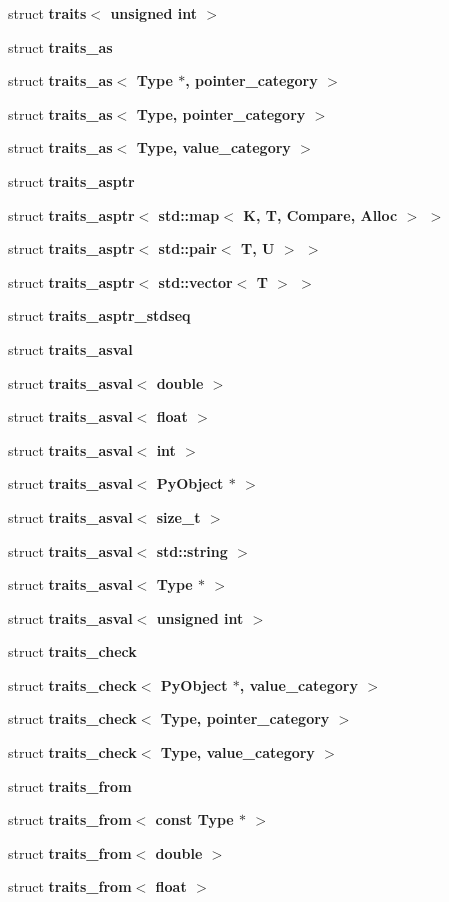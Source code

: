 \begin{DoxyCompactItemize}
struct {\bf traits$<$ unsigned int $>$}
\item 
struct {\bf traits\+\_\+as}
\item 
struct {\bf traits\+\_\+as$<$ Type $\ast$, pointer\+\_\+category $>$}
\item 
struct {\bf traits\+\_\+as$<$ Type, pointer\+\_\+category $>$}
\item 
struct {\bf traits\+\_\+as$<$ Type, value\+\_\+category $>$}
\item 
struct {\bf traits\+\_\+asptr}
\item 
struct {\bfseries traits\+\_\+asptr$<$ std\+::map$<$ K, T, Compare, Alloc $>$ $>$}
\item 
struct {\bfseries traits\+\_\+asptr$<$ std\+::pair$<$ T, U $>$ $>$}
\item 
struct {\bfseries traits\+\_\+asptr$<$ std\+::vector$<$ T $>$ $>$}
\item 
struct {\bf traits\+\_\+asptr\+\_\+stdseq}
\item 
struct {\bf traits\+\_\+asval}
\item 
struct {\bf traits\+\_\+asval$<$ double $>$}
\item 
struct {\bf traits\+\_\+asval$<$ float $>$}
\item 
struct {\bf traits\+\_\+asval$<$ int $>$}
\item 
struct {\bf traits\+\_\+asval$<$ Py\+Object $\ast$ $>$}
\item 
struct {\bf traits\+\_\+asval$<$ size\+\_\+t $>$}
\item 
struct {\bfseries traits\+\_\+asval$<$ std\+::string $>$}
\item 
struct {\bf traits\+\_\+asval$<$ Type $\ast$ $>$}
\item 
struct {\bf traits\+\_\+asval$<$ unsigned int $>$}
\item 
struct {\bf traits\+\_\+check}
\item 
struct {\bf traits\+\_\+check$<$ Py\+Object $\ast$, value\+\_\+category $>$}
\item 
struct {\bf traits\+\_\+check$<$ Type, pointer\+\_\+category $>$}
\item 
struct {\bf traits\+\_\+check$<$ Type, value\+\_\+category $>$}
\item 
struct {\bf traits\+\_\+from}
\item 
struct {\bf traits\+\_\+from$<$ const Type $\ast$ $>$}
\item 
struct {\bf traits\+\_\+from$<$ double $>$}
\item 
struct {\bf traits\+\_\+from$<$ float $>$}

\end{DoxyCompactItemize}
